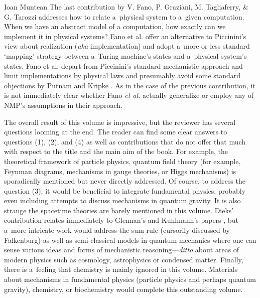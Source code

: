 \begin{recengenv}{Ioan Muntean}
The last contribution by V. Fano, P. Graziani, M. Tagliaferry, \& G. Tarozzi addresses how to relate a~physical system to a~given computation. When we have an abstract model of a computation, how exactly can we implement it in physical systems? Fano et al. offer an alternative to Piccinini's
\parencite*[][]{piccinini_physical_2015_mm} %
 view about realization (\textit{aka} implementation) and adopt a~more or less standard ‘mapping' strategy between a~Turing machine's states and a~physical system's states. Fano et al. depart from Piccinini's standard mechanistic approach and limit implementations by physical laws and presumably avoid some standard objections by Putnam and Kripke 
\parencite*[][pp.217–218]{falkenburg_mechanistic_2019}. %
 As in the case of the previous contribution, it is not immediately clear whether Fano \textit{et al.} actually generalize or employ any of NMP's assumptions in their approach.

The overall result of this volume is impressive, but the reviewer has several questions looming at the end. The reader can find some clear answers to questions (1), (2), and (4) as well as contributions that do not offer that much with respect to the title and the main aim of the book. For example, the theoretical framework of particle physics, quantum field theory (for example, Feynman diagrams, mechanisms in gauge theories, or Higgs mechanisms) is sporadically mentioned but never directly addressed. Of course, to address the question (3), it would be beneficial to integrate fundamental physics, probably even including attempts to discuss mechanisms in quantum gravity. It is also strange the spacetime theories are barely mentioned in this volume. Dieks' contribution relates immediately to Glennan's and Kuhlmann's papers
\parencites[][]{kuhlmann_relation_2014}[][]{kuhlmann_mechanisms_2017}, %
 but a~more intricate work would address the sum rule (cursorily discussed by Falkenburg) as well as semi-classical models in quantum mechanics where one can sense various ideas and forms of mechanistic reasoning---\textit{ditto} about areas of modern physics such as cosmology, astrophysics or condensed matter. Finally, there is a~feeling that chemistry is mainly ignored in this volume. Materials about mechanisms in fundamental physics (particle physics and perhaps quantum gravity), chemistry, or biochemistry would complete this outstanding volume.


\end{recengenv}
